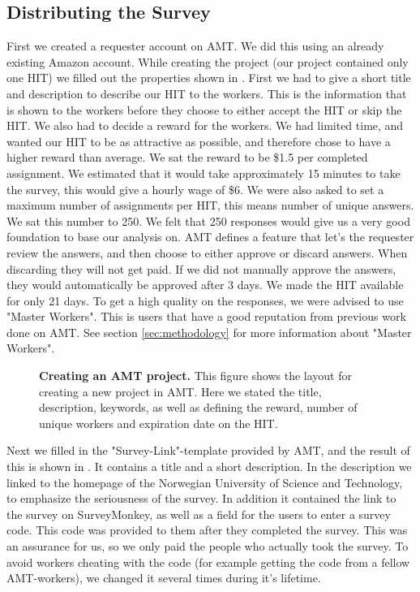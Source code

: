 \subsection{Distributing the Survey}
First we created a requester account on AMT. We did this using an already existing Amazon account. While creating the project (our project contained only one HIT) we filled out the properties shown in . First we had to give a short title and description to describe our HIT to the workers. This is the information that is shown to the workers before they choose to either accept the HIT or skip the HIT. We also had to decide a reward for the workers. We had limited time, and wanted our HIT to be as attractive as possible, and therefore chose to have a higher reward than average. We sat the reward to be \$1.5 per completed assignment. We estimated that it would take approximately 15 minutes to take the survey, this would give a hourly wage of \$6. We were also asked to set a maximum number of assignments per HIT, this means number of unique answers. We sat this number to 250. We felt that 250 responses would give us a very good foundation to base our analysis on. AMT defines a feature that let's the requester review the answers, and then choose to either approve or discard answers. When discarding they will not get paid. If we did not manually approve the answers, they would automatically be approved after 3 days. We made the HIT available for only 21 days. To get a high quality on the responses, we were advised to use "Master Workers". This is users that have a good reputation from previous work done on AMT. See section \ref{sec:methodology} for more information about "Master Workers". 

\begin{figure}[h!]
\centering
{}
\caption[Creating an AMT project]{\textbf{Creating an AMT project.} This figure shows the layout for creating a new project in AMT. Here we stated the title, description, keywords, as well as defining the reward, number of unique workers and expiration date on the HIT.} 
\label{fig:amtedit}
\end{figure}

Next we filled in the "Survey-Link"-template provided by AMT, and the result of this is shown in . It contains a title and a short description. In the description we linked to the homepage of the Norwegian University of Science and Technology, to emphasize the seriousness of the survey. In addition it contained the link to the survey on SurveyMonkey, as well as a field for the users to enter a survey code. This code was provided to them after they completed the survey. This was an assurance for us, so we only paid the people who actually took the survey. To avoid workers cheating with the code (for example getting the code from a fellow AMT-workers), we changed it several times during it's lifetime. 

